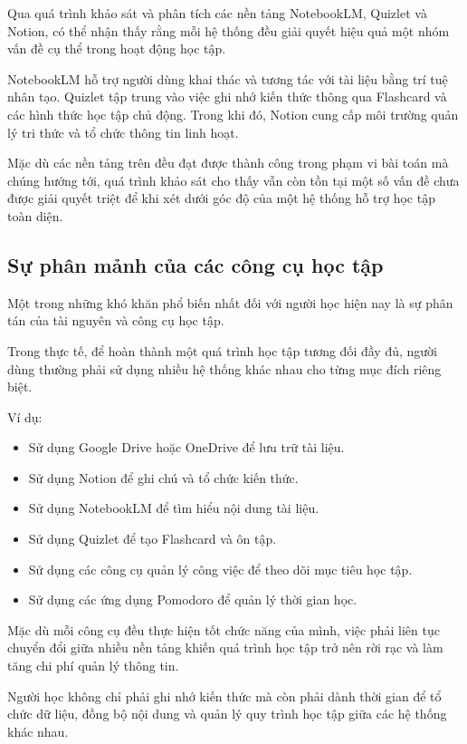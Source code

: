 Qua quá trình khảo sát và phân tích các nền tảng NotebookLM, Quizlet và Notion, có thể nhận thấy rằng mỗi hệ thống đều giải quyết hiệu quả một nhóm vấn đề cụ thể trong hoạt động học tập.

NotebookLM hỗ trợ người dùng khai thác và tương tác với tài liệu bằng trí tuệ nhân tạo. Quizlet tập trung vào việc ghi nhớ kiến thức thông qua Flashcard và các hình thức học tập chủ động. Trong khi đó, Notion cung cấp môi trường quản lý tri thức và tổ chức thông tin linh hoạt.

Mặc dù các nền tảng trên đều đạt được thành công trong phạm vi bài toán mà chúng hướng tới, quá trình khảo sát cho thấy vẫn còn tồn tại một số vấn đề chưa được giải quyết triệt để khi xét dưới góc độ của một hệ thống hỗ trợ học tập toàn diện.

\subsection{Sự phân mảnh của các công cụ học tập}

Một trong những khó khăn phổ biến nhất đối với người học hiện nay là sự phân tán của tài nguyên và công cụ học tập.

Trong thực tế, để hoàn thành một quá trình học tập tương đối đầy đủ, người dùng thường phải sử dụng nhiều hệ thống khác nhau cho từng mục đích riêng biệt.

Ví dụ:
\begin{itemize}
    \item Sử dụng Google Drive hoặc OneDrive để lưu trữ tài liệu.
    \item Sử dụng Notion để ghi chú và tổ chức kiến thức.
    \item Sử dụng NotebookLM để tìm hiểu nội dung tài liệu.
    \item Sử dụng Quizlet để tạo Flashcard và ôn tập.
    \item Sử dụng các công cụ quản lý công việc để theo dõi mục tiêu học tập.
    \item Sử dụng các ứng dụng Pomodoro để quản lý thời gian học.
\end{itemize}

Mặc dù mỗi công cụ đều thực hiện tốt chức năng của mình, việc phải liên tục chuyển đổi giữa nhiều nền tảng khiến quá trình học tập trở nên rời rạc và làm tăng chi phí quản lý thông tin.

Người học không chỉ phải ghi nhớ kiến thức mà còn phải dành thời gian để tổ chức dữ liệu, đồng bộ nội dung và quản lý quy trình học tập giữa các hệ thống khác nhau.

